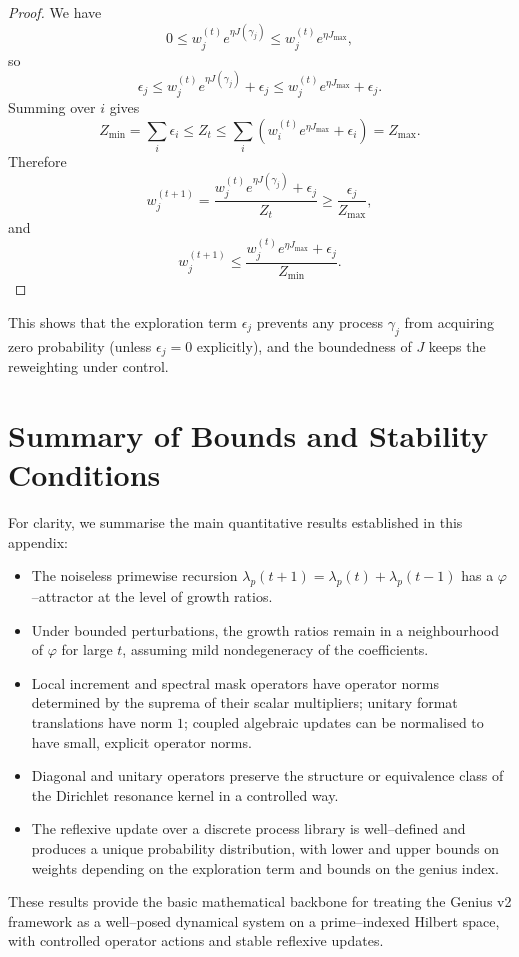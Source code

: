 \documentclass[11pt]{article}
\begin{document}
\begin{proof}
We have
\[
0 \leq w_j^{(t)} e^{\eta J(\gamma_j)} \leq w_j^{(t)} e^{\eta J_{\max}},
\]
so
\[
\epsilon_j \leq w_j^{(t)} e^{\eta J(\gamma_j)} + \epsilon_j \leq w_j^{(t)} e^{\eta J_{\max}} + \epsilon_j.
\]
Summing over $i$ gives
\[
Z_{\min} = \sum_i \epsilon_i \leq Z_t \leq \sum_i \left(w_i^{(t)} e^{\eta J_{\max}} + \epsilon_i\right) = Z_{\max}.
\]
Therefore
\[
w_j^{(t+1)}
= \frac{w_j^{(t)} e^{\eta J(\gamma_j)} + \epsilon_j}{Z_t}
\geq \frac{\epsilon_j}{Z_{\max}},
\]
and
\[
w_j^{(t+1)}
\leq \frac{w_j^{(t)} e^{\eta J_{\max}} + \epsilon_j}{Z_{\min}}.
\]
\end{proof}

This shows that the exploration term $\epsilon_j$ prevents any process $\gamma_j$ from acquiring zero probability (unless $\epsilon_j=0$ explicitly), and the boundedness of $J$ keeps the reweighting under control.

\section{Summary of Bounds and Stability Conditions}

For clarity, we summarise the main quantitative results established in this appendix:

\begin{itemize}[nosep]
  \item The noiseless primewise recursion $\lambda_p(t+1) = \lambda_p(t) + \lambda_p(t-1)$ has a $\varphi$–attractor at the level of growth ratios.
  \item Under bounded perturbations, the growth ratios remain in a neighbourhood of $\varphi$ for large $t$, assuming mild nondegeneracy of the coefficients.
  \item Local increment and spectral mask operators have operator norms determined by the suprema of their scalar multipliers; unitary format translations have norm $1$; coupled algebraic updates can be normalised to have small, explicit operator norms.
  \item Diagonal and unitary operators preserve the structure or equivalence class of the Dirichlet resonance kernel in a controlled way.
  \item The reflexive update over a discrete process library is well–defined and produces a unique probability distribution, with lower and upper bounds on weights depending on the exploration term and bounds on the genius index.
\end{itemize}

These results provide the basic mathematical backbone for treating the Genius v2 framework as a well–posed dynamical system on a prime–indexed Hilbert space, with controlled operator actions and stable reflexive updates.


\nocite{*}


\end{document}
